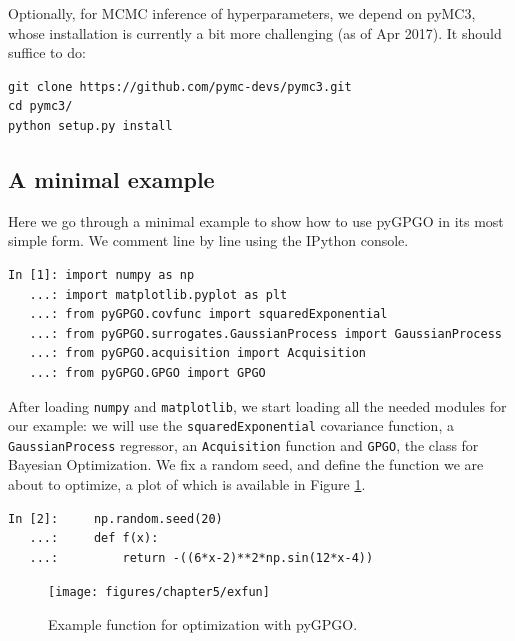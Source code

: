 \documentclass[10pt,a4paper,twoside]{book}
\begin{document}
Optionally, for MCMC inference of hyperparameters, we depend on pyMC3, whose installation is currently a bit more challenging (as of Apr 2017). It should suffice to do:

\begin{verbatim}
git clone https://github.com/pymc-devs/pymc3.git
cd pymc3/
python setup.py install               
\end{verbatim}

 
\subsection{A minimal example}

Here we go through a minimal example to show how to use pyGPGO in its most simple form. We comment line by line using the IPython console.

\begin{verbatim}
In [1]: import numpy as np
   ...: import matplotlib.pyplot as plt
   ...: from pyGPGO.covfunc import squaredExponential
   ...: from pyGPGO.surrogates.GaussianProcess import GaussianProcess
   ...: from pyGPGO.acquisition import Acquisition
   ...: from pyGPGO.GPGO import GPGO               
\end{verbatim}

After loading \texttt{numpy} and \texttt{matplotlib}, we start loading all the needed modules for our example: we will use the \texttt{squaredExponential} covariance function, a \texttt{GaussianProcess} regressor, an \texttt{Acquisition} function and \texttt{GPGO}, the class for Bayesian Optimization. We fix a random seed, and define the function we are about to optimize, a plot of which is available in Figure \ref{fig:exfun}.

\begin{verbatim}
In [2]:     np.random.seed(20)
   ...:     def f(x):
   ...:         return -((6*x-2)**2*np.sin(12*x-4))
\end{verbatim}

\begin{figure}
\centering
\caption{Example function for optimization with pyGPGO.}
\texttt{[image: figures/chapter5/exfun]}
\label{fig:exfun}
\end{figure}
\end{document}
